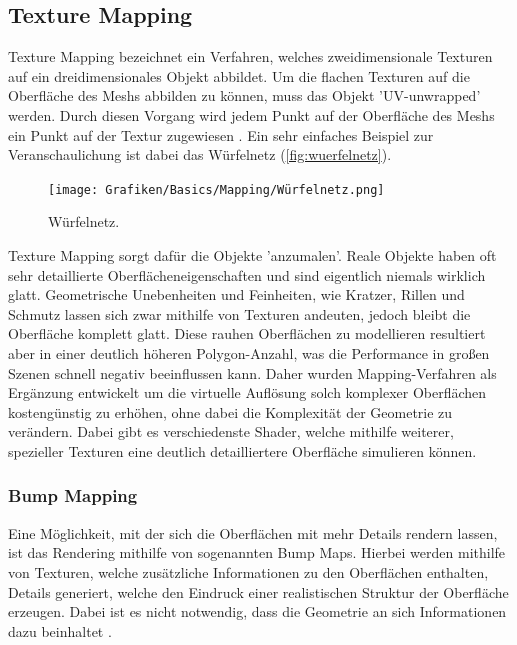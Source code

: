 \subsection{Texture Mapping}

Texture Mapping bezeichnet ein Verfahren, welches zweidimensionale Texturen auf ein dreidimensionales Objekt
abbildet. Um die flachen Texturen auf die Oberfläche des Meshs abbilden zu können, muss das Objekt 'UV-unwrapped' werden.
Durch diesen Vorgang wird jedem Punkt auf der Oberfläche des Meshs ein Punkt auf der Textur zugewiesen \parencite{Catmull1974} \parencite{Blinn1976}.
Ein sehr einfaches Beispiel zur Veranschaulichung ist dabei das Würfelnetz (\autoref{fig:wuerfelnetz}).
\begin{figure}[h]
	\centering
	\texttt{[image: Grafiken/Basics/Mapping/Würfelnetz.png]}
	\begin{footnotesize}
		\caption{Würfelnetz.}
		\label{fig:wuerfelnetz}
	\end{footnotesize}
\end{figure}

Texture Mapping sorgt dafür die Objekte 'anzumalen'.
Reale Objekte haben oft sehr detaillierte Oberflächeneigenschaften und sind eigentlich niemals wirklich glatt.
Geometrische Unebenheiten und Feinheiten, wie Kratzer, Rillen und Schmutz lassen sich zwar mithilfe von
Texturen andeuten, jedoch bleibt die Oberfläche komplett glatt. Diese rauhen Oberflächen zu modellieren resultiert
aber in einer deutlich höheren Polygon-Anzahl, was die Performance in großen Szenen schnell negativ beeinflussen kann.
Daher wurden Mapping-Verfahren als Ergänzung entwickelt um die virtuelle Auflösung
solch komplexer Oberflächen kostengünstig zu erhöhen, ohne dabei die Komplexität der Geometrie zu verändern.
Dabei gibt es verschiedenste Shader, welche mithilfe weiterer, spezieller Texturen eine deutlich detailliertere
Oberfläche simulieren können.


\subsubsection{Bump Mapping}

Eine Möglichkeit, mit der sich die Oberflächen mit mehr Details rendern lassen, ist das Rendering
mithilfe von sogenannten Bump Maps.
Hierbei werden mithilfe von Texturen, welche zusätzliche Informationen zu den Oberflächen enthalten,
Details generiert, welche den Eindruck einer realistischen Struktur der Oberfläche erzeugen.
Dabei ist es nicht notwendig, dass die Geometrie an sich Informationen dazu beinhaltet \parencite{Blinn1978}.

